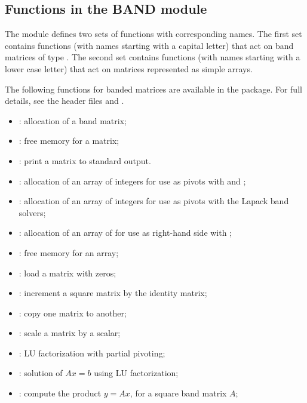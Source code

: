 \subsection{Functions in the BAND module}\label{ss:band}

The {\band} module defines two sets of functions with corresponding names.
The first set contains functions (with names starting with a capital letter)
that act on band matrices of type .  The second set contains functions
(with names starting with a lower case letter) that act on matrices represented 
as simple arrays.

The following functions for  banded matrices are available
in the {\band} package.  For full details, see the header files
 and .
\begin{itemize}
\item {}: allocation of a  band matrix;
\item {}: free memory for a  matrix;
\item {}: print a  matrix to standard output.
\item {}: allocation of an array of integers for use
  as pivots with  and ;
\item {}: allocation of an array of  integers for use
  as pivots with the Lapack band solvers;
\item {}: allocation of an array of  for use
  as right-hand side with ;
\item {}: free memory for an array;
\item {}: load a matrix with zeros;
\item {}: increment a square matrix by the identity matrix;
\item {}: copy one matrix to another;
\item {}: scale a matrix by a scalar;
\item {}: LU factorization with partial pivoting;
\item {}: solution of $Ax = b$ using LU factorization;
\item {}: compute the product $y = Ax$, for a square band matrix $A$;
\end{itemize}

